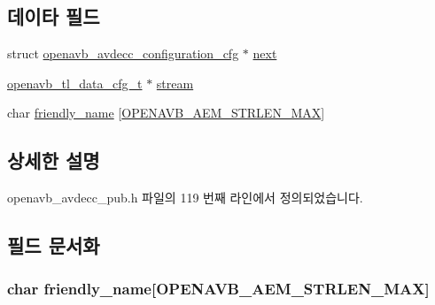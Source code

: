 \subsection*{데이타 필드}
\begin{DoxyCompactItemize}
\item 
struct \hyperlink{structopenavb__avdecc__configuration__cfg}{openavb\+\_\+avdecc\+\_\+configuration\+\_\+cfg} $\ast$ \hyperlink{structopenavb__avdecc__configuration__cfg_a13b43aae3e8c6dd90ec7d829cb84d0d5}{next}
\item 
\hyperlink{openavb__avdecc__read__ini__pub_8h_a2c6c3608b0b8c34af5fa95c11753cfc0}{openavb\+\_\+tl\+\_\+data\+\_\+cfg\+\_\+t} $\ast$ \hyperlink{structopenavb__avdecc__configuration__cfg_a92c9ac28f244e59bcba3681be48f1c86}{stream}
\item 
char \hyperlink{structopenavb__avdecc__configuration__cfg_a002bf40d021a57a4f9275a605e66c065}{friendly\+\_\+name} \mbox{[}\hyperlink{openavb__aem__types__pub_8h_ab2bb82e9f856a76b8305e4864f23ee58}{O\+P\+E\+N\+A\+V\+B\+\_\+\+A\+E\+M\+\_\+\+S\+T\+R\+L\+E\+N\+\_\+\+M\+AX}\mbox{]}
\end{DoxyCompactItemize}


\subsection{상세한 설명}


openavb\+\_\+avdecc\+\_\+pub.\+h 파일의 119 번째 라인에서 정의되었습니다.



\subsection{필드 문서화}
\subsubsection[{\texorpdfstring{friendly\+\_\+name}{friendly_name}}]{\setlength{\rightskip}{0pt plus 5cm}char friendly\+\_\+name\mbox{[}{\bf O\+P\+E\+N\+A\+V\+B\+\_\+\+A\+E\+M\+\_\+\+S\+T\+R\+L\+E\+N\+\_\+\+M\+AX}\mbox{]}}\hypertarget{structopenavb__avdecc__configuration__cfg_a002bf40d021a57a4f9275a605e66c065}{}\label{structopenavb__avdecc__configuration__cfg_a002bf40d021a57a4f9275a605e66c065}


